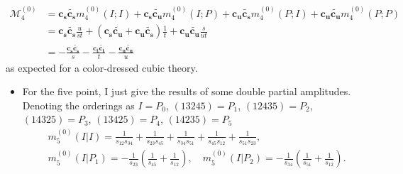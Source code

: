 \documentclass{beamer}
\begin{document}
\begin{frame}
    \begin{align*}
        \!\!\!\!\mathcal{M}_4^{(0)}&=\mathbf{c_s}\tilde{\mathbf{c_s}}m_4^{(0)}(I;I)+\mathbf{c_s}\tilde{\mathbf{c_u}}m_4^{(0)}(I;P)+\mathbf{c_u}\tilde{\mathbf{c_s}}m_4^{(0)}(P;I)+\mathbf{c_u}\tilde{\mathbf{c_u}}m_4^{(0)}(P;P)\\
        &=\mathbf{c_s}\tilde{\mathbf{c_s}}\frac{u}{st}+(\mathbf{c_s}\tilde{\mathbf{c_u}}+\mathbf{c_u}\tilde{\mathbf{c_s}})\frac{1}{t}+\mathbf{c_u}\tilde{\mathbf{c_u}}\frac{s}{ut}\\
        &=-\frac{\mathbf{c_s}\tilde{\mathbf{c_s}}}{s}-\frac{\mathbf{c_t}\tilde{\mathbf{c_t}}}{t}-\frac{\mathbf{c_u}\tilde{\mathbf{c_u}}}{u}
    \end{align*}
    \quad \quad as expected for a color-dressed cubic theory.
    \pause
    \begin{itemize}
        \item For the five point, I just give the results of some double partial amplitudes.
        Denoting the orderings as $I=P_0$, $(13245)=P_1$, $(12435)=P_2$, $(14325)=P_3$, $(13425)=P_4$, $(14235)=P_5$
        \begin{equation*}
            \begin{aligned}&m_5^{(0)}(I|I)=\frac{1}{s_{12}s_{34}}+\frac{1}{s_{23}s_{45}}+\frac{1}{s_{34}s_{51}}+\frac{1}{s_{45}s_{12}}+\frac{1}{s_{51}s_{23}},\\&m_5^{(0)}(I|P_1)=-\frac{1}{s_{23}}\left(\frac{1}{s_{45}}+\frac{1}{s_{12}}\right),\quad
                m_5^{(0)}(I|P_2)=-\frac{1}{s_{34}}\left(\frac{1}{s_{51}}+\frac{1}{s_{12}}\right).\end{aligned}
        \end{equation*}
    \end{itemize}
\end{frame}
\end{document}
